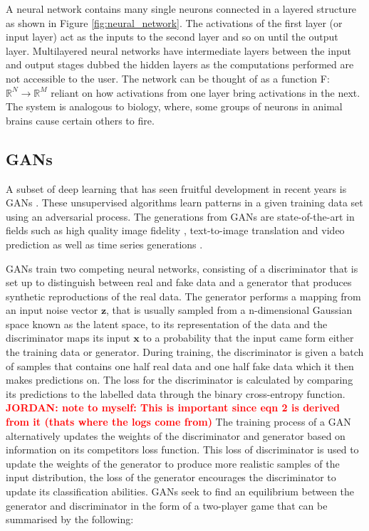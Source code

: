 \documentclass[12pt]{iopart}
\newcommand{\jordan}[1]{\textbf{\textcolor{red}{JORDAN: #1}}}
\begin{document}
A neural network contains many single neurons connected in a layered structure as shown in Figure \ref{fig:neural_network}. The activations of the first layer (or input layer) act as the inputs to the second layer and so on until the output layer. Multilayered neural networks have intermediate layers between the input and output stages dubbed the hidden layers as the computations performed are not accessible to the user. The network can be thought of as a function F: $\mathbb{R}^N\rightarrow \mathbb{R}^M $ reliant on how activations from one layer bring activations in the next. The system is analogous to biology, where, some groups of neurons in animal brains cause certain others to fire. 

\subsection{GANs}

A subset of deep learning that has seen fruitful development in recent years is \acp{GAN} \cite{Goodfellow2014}. These unsupervised algorithms learn
patterns in a given training data set using an adversarial process. The
generations from \acp{GAN} are state-of-the-art in fields such as high quality image
fidelity \cite{brock2018large,karras2019analyzing}, text-to-image translation
\cite{reed2016generative} and video prediction \cite{liang2017dual} as well as
time series generations \cite{esteban2017realvalued}. 

%
\acp{GAN} train two competing neural networks, consisting of a discriminator
that is set up to distinguish between real and fake data and a generator that
produces synthetic reproductions of the real data. The generator performs a
mapping from an input noise vector $\mathbf{z}$, that is usually sampled from a n-dimensional Gaussian space known as the latent space, to its representation of the
data and the discriminator maps its input $\mathbf{x}$ to a probability that
the input came form either the training data or generator.  During training,
the discriminator is given a batch of samples that contains one half real data
and one half fake data which it then makes predictions on. The loss for the
discriminator is calculated by comparing its predictions to the labelled data
through the binary cross-entropy function. \jordan{note to myself: This is important since eqn 2 is derived from it (thats where the logs come from)} The training process of a \ac{GAN}
alternatively updates the weights of the discriminator and generator based on
information on its competitors loss function. This loss of discriminator is
used to update the weights of the generator to produce more realistic samples
of the input distribution, the loss of the generator encourages the
discriminator to update its classification abilities. GANs seek to find an equilibrium between the generator and discriminator in the form of a two-player game that can be summarised by the following:  
\end{document}
